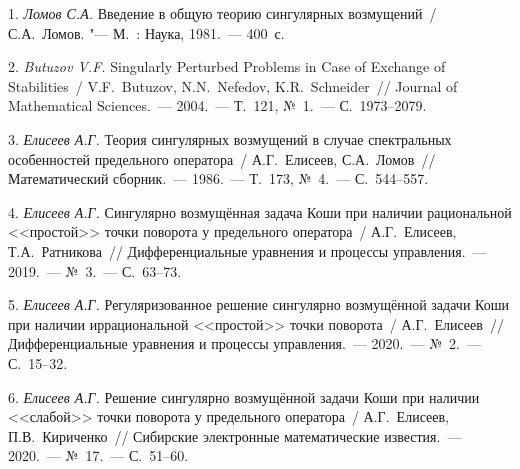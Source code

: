 \litlist

1. {\it Ломов С.А.} Введение в общую теорию сингулярных возмущений~/ С.А.~Ломов. "--- М.~: Наука, 1981.~--- 400~с.

2. {\it Butuzov V.F.} Singularly Perturbed Problems in Case of Exchange of Stabilities~/ V.F.~Butuzov, N.N.~Nefedov, K.R.~Schneider~// Journal of Mathematical Sciences.~--- 2004.~--- Т.~121, №~1.~--- С.~1973--2079.

3. {\it Елисеев А.Г.} Теория сингулярных возмущений в случае спектральных особенностей предельного оператора~/ А.Г.~Елисеев, \linebreak С.А.~Ломов~// Математический сборник.~--- 1986.~--- Т.~173, №~4.~--- С.~544--557.

4. {\it Елисеев А.Г.} Сингулярно возмущённая задача Коши при наличии рациональной <<простой>> точки поворота у предельного оператора~/ А.Г.~Елисеев, Т.А.~Ратникова~// Дифференциальные уравнения и процессы управления.~--- 2019.~--- №~3.~--- С.~63--73.

5. {\it Елисеев А.Г.} Регуляризованное решение сингулярно возмущённой задачи Коши при наличии иррациональной <<простой>> точки поворота~/ А.Г.~Елисеев~// Дифференциальные уравнения и процессы управления.~--- 2020.~--- №~2.~--- С.~15--32.

6. {\it Елисеев А.Г.} Решение сингулярно возмущённой задачи Коши при наличии <<слабой>> точки поворота у предельного оператора~/ А.Г.~Елисеев, П.В.~Кириченко~// Сибирские электронные математические известия.~--- 2020.~--- №~17.~--- С.~51--60.

